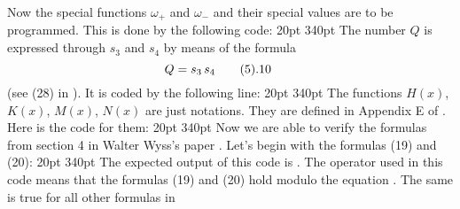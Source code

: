 \medskip
Now the special functions $\omega_{+}$ and $\omega_{-}$ and their special
values are to be programmed. This is done by the following code:
\medskip
{} 20pt 340pt
\noindent
{}
\medskip
The number $Q$ is expressed through $s_3$ and $s_4$ by means of the formula
$$
\hskip -2em
Q=s_3\,s_4
\mytag{5.10}
$$
(see (28) in ). It is coded by the following line:
\medskip
{} 20pt 340pt
\noindent
{}
\medskip
The functions $H(x)$, $K(x)$, $M(x)$, $N(x)$ are just notations. They are 
defined in Appendix E of . Here is the code for them:
\medskip
{} 20pt 340pt
\noindent
{}
\medskip
Now we are able to verify the formulas from section 4 in Walter Wyss's paper
. Let's begin with the formulas (19) and (20): 
\medskip
{} 20pt 340pt
\noindent
{}
\medskip
\noindent
The expected output of this code is . The 
operator used in this code means that the formulas (19) and (20) hold modulo
the equation . The same is true for all other formulas in
